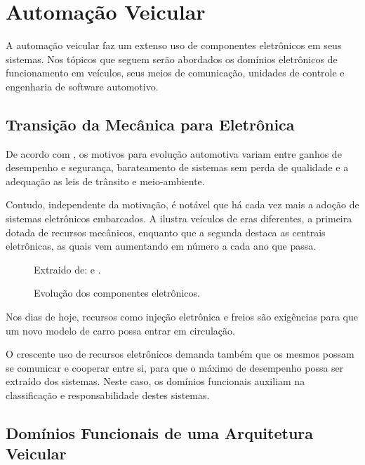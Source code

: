 \chapter{Automação Veicular}
\label{cap:automacao_veicular}

A automação veicular faz um extenso uso de componentes eletrônicos em seus sistemas. Nos tópicos que seguem serão abordados os domínios eletrônicos de funcionamento em veículos, seus meios de comunicação, unidades de controle e engenharia de software automotivo.

\section{Transição da Mecânica para Eletrônica}

De acordo com , os motivos para evolução automotiva variam entre ganhos de desempenho e segurança, barateamento de sistemas sem perda de qualidade e a adequação as leis de trânsito e meio-ambiente. 

Contudo, independente da motivação, é notável que há cada vez mais a adoção de sistemas eletrônicos embarcados. A  ilustra veículos de eras diferentes, a primeira dotada de recursos mecânicos, enquanto que a segunda destaca as centrais eletrônicas, as quais vem aumentando em número a cada ano que passa.

\begin{figure}[htb]
	\centering
	\caption{Evolução dos componentes eletrônicos.}
	Extraido de:  e .
	\label{fig:cap2_car_evolution}
\end{figure}

Nos dias de hoje, recursos como injeção eletrônica e freios  são exigências para que um novo modelo de carro possa entrar em circulação.

O crescente uso de recursos eletrônicos demanda também que os mesmos possam se comunicar e cooperar entre si, para que o máximo de desempenho possa ser extraído dos sistemas. Neste caso, os domínios funcionais auxiliam na classificação e responsabilidade destes sistemas.

\section{Domínios Funcionais de uma Arquitetura Veicular}


